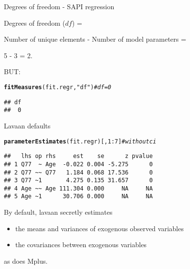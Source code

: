 \documentclass[10pt]{beamer}\usepackage[]{graphicx}\usepackage[]{xcolor}
\makeatletter
\newcommand{\hlnum}[1]{\textcolor[rgb]{0.686,0.059,0.569}{#1}}%
\newcommand{\hlstr}[1]{\textcolor[rgb]{0.192,0.494,0.8}{#1}}%
\newcommand{\hlcom}[1]{\textcolor[rgb]{0.678,0.584,0.686}{\textit{#1}}}%
\newcommand{\hlopt}[1]{\textcolor[rgb]{0,0,0}{#1}}%
\newcommand{\hlstd}[1]{\textcolor[rgb]{0.345,0.345,0.345}{#1}}%
\newcommand{\hlkwd}[1]{\textcolor[rgb]{0.737,0.353,0.396}{\textbf{#1}}}%
\newenvironment{kframe}{%
 \def\at@end@of@kframe{}%
 \ifinner\ifhmode%
  \def\at@end@of@kframe{\end{minipage}}%
  \begin{minipage}{\columnwidth}%
 \fi\fi%
 \def\FrameCommand##1{\hskip\@totalleftmargin \hskip-\fboxsep
 \colorbox{shadecolor}{##1}\hskip-\fboxsep
     \hskip-\linewidth \hskip-\@totalleftmargin \hskip\columnwidth}%
 \MakeFramed {\advance\hsize-\width
   \@totalleftmargin\z@ \linewidth\hsize
   \@setminipage}}%
 {\par\unskip\endMakeFramed%
 \at@end@of@kframe}
\newenvironment{knitrout}{}{} %
\makeatother
\begin{document}
%
\begin{frame}[fragile]{Degrees of freedom - SAPI regression}

Degrees of freedom ($df$) = 

\vspace{5mm}

Number of unique elements - Number of model parameters = 

\vspace{5mm}

5 - 3 = 2.

\vspace{5mm}

BUT:\\
\begin{knitrout}
\color{fgcolor}\begin{kframe}
\begin{alltt}
\hlkwd{fitMeasures}\hlstd{(fit.regr,} \hlstr{"df"}\hlstd{)} \hlcom{# df = 0}
\end{alltt}
\begin{verbatim}
## df 
##  0
\end{verbatim}
\end{kframe}
\end{knitrout}

\end{frame}
%
\begin{frame}[fragile]{Lavaan defaults}

\begin{knitrout}
\color{fgcolor}\begin{kframe}
\begin{alltt}
\hlkwd{parameterEstimates}\hlstd{(fit.regr)[,}\hlnum{1}\hlopt{:}\hlnum{7}\hlstd{]} \hlcom{# without ci}
\end{alltt}
\begin{verbatim}
##   lhs op rhs     est    se      z pvalue
## 1 Q77  ~ Age  -0.022 0.004 -5.275      0
## 2 Q77 ~~ Q77   1.184 0.068 17.536      0
## 3 Q77 ~1       4.275 0.135 31.657      0
## 4 Age ~~ Age 111.304 0.000     NA     NA
## 5 Age ~1      30.706 0.000     NA     NA
\end{verbatim}
\end{kframe}
\end{knitrout}

By default, lavaan secretly estimates
\begin{itemize}
  \item the means and variances of exogenous observed variables
  \item the covariances between exogenous variables
\end{itemize}
as does Mplus.

\end{frame}
\end{document}
